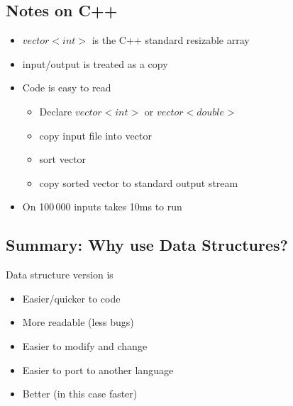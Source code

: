 \begin{slide}
\section{Notes on C++}

\begin{PauseHighLight}
  \begin{itemize}
  \item \jl$vector<int>$ is the C++ standard resizable array\pause
  \item input/output is treated as a copy\pause
  \item Code is easy to read
    \begin{itemize}
    \item Declare \jl$vector<int>$ or \jl$vector<double>$
    \item copy input file into vector
    \item sort vector
    \item copy sorted vector to standard output stream
    \end{itemize}\pause
  \item On 100\,000 inputs takes 10ms to run\pause
  \end{itemize}
\end{PauseHighLight}
\end{slide}



\begin{slide}
\section{Summary: Why use Data Structures?}

\begin{PauseHighLight}
  Data structure version is
  \begin{itemize}
  \item Easier/quicker to code\pause
  \item More readable (less bugs)\pause
  \item Easier to modify and change\pause
  \item Easier to port to another language\pause
  \item Better (in this case faster)\pause
  \end{itemize}
\end{PauseHighLight}

\end{slide}



